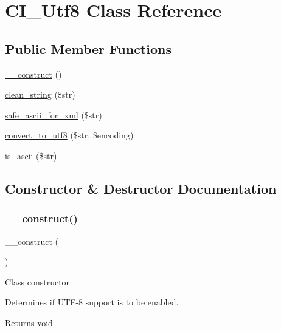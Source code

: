 \hypertarget{class_c_i___utf8}{}\section{C\+I\+\_\+\+Utf8 Class Reference}
\label{class_c_i___utf8}
\subsection*{Public Member Functions}
\begin{DoxyCompactItemize}
\item 
\mbox{\hyperlink{class_c_i___utf8_a095c5d389db211932136b53f25f39685}{\+\_\+\+\_\+construct}} ()
\item 
\mbox{\hyperlink{class_c_i___utf8_af9fc6214803042dd0b46d6ac5bdb4b7b}{clean\+\_\+string}} (\$str)
\item 
\mbox{\hyperlink{class_c_i___utf8_a10d712b507a87fd841f134143eaedb8e}{safe\+\_\+ascii\+\_\+for\+\_\+xml}} (\$str)
\item 
\mbox{\hyperlink{class_c_i___utf8_a7f6a8b9f00d7d11b23abcadfc91e9583}{convert\+\_\+to\+\_\+utf8}} (\$str, \$encoding)
\item 
\mbox{\hyperlink{class_c_i___utf8_a8676dd1e98c759c6ef90fe6a9ba4e119}{is\+\_\+ascii}} (\$str)
\end{DoxyCompactItemize}


\subsection{Constructor \& Destructor Documentation}
\mbox{\label{class_c_i___utf8_a095c5d389db211932136b53f25f39685}} 
\subsubsection{\texorpdfstring{\+\_\+\+\_\+construct()}{\_\_construct()}}
{\footnotesize\ttfamily \+\_\+\+\_\+construct (\begin{DoxyParamCaption}{ }\end{DoxyParamCaption})}

Class constructor

Determines if U\+T\+F-\/8 support is to be enabled.

\begin{DoxyReturn}{Returns}
void 
\end{DoxyReturn}


